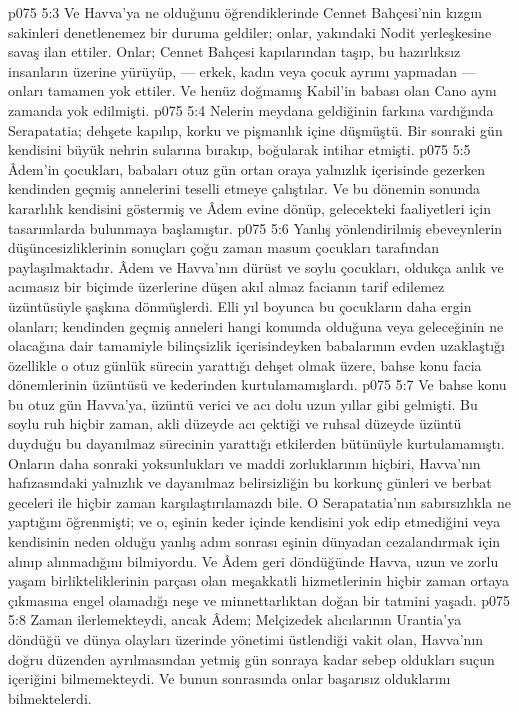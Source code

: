 \vs p075 5:3 Ve Havva’ya ne olduğunu öğrendiklerinde Cennet Bahçesi’nin kızgın sakinleri denetlenemez bir duruma geldiler; onlar, yakındaki Nodit yerleşkesine savaş ilan ettiler. Onlar; Cennet Bahçesi kapılarından taşıp, bu hazırlıksız insanların üzerine yürüyüp, --- erkek, kadın veya çocuk ayrımı yapmadan --- onları tamamen yok ettiler. Ve henüz doğmamış Kabil’in babası olan Cano aynı zamanda yok edilmişti.
\vs p075 5:4 Nelerin meydana geldiğinin farkına vardığında Serapatatia; dehşete kapılıp, korku ve pişmanlık içine düşmüştü. Bir sonraki gün kendisini büyük nehrin sularına bırakıp, boğularak intihar etmişti.
\vs p075 5:5 Âdem’in çocukları, babaları otuz gün ortan oraya yalnızlık içerisinde gezerken kendinden geçmiş annelerini teselli etmeye çalıştılar. Ve bu dönemin sonunda kararlılık kendisini göstermiş ve Âdem evine dönüp, gelecekteki faaliyetleri için tasarımlarda bulunmaya başlamıştır.
\vs p075 5:6 Yanlış yönlendirilmiş ebeveynlerin düşüncesizliklerinin sonuçları çoğu zaman masum çocukları tarafından paylaşılmaktadır. Âdem ve Havva’nın dürüst ve soylu çocukları, oldukça anlık ve acımasız bir biçimde üzerlerine düşen akıl almaz facianın tarif edilemez üzüntüsüyle şaşkına dönmüşlerdi. Elli yıl boyunca bu çocukların daha ergin olanları; kendinden geçmiş anneleri hangi konumda olduğuna veya geleceğinin ne olacağına dair tamamiyle bilinçsizlik içerisindeyken babalarının evden uzaklaştığı özellikle o otuz günlük sürecin yarattığı dehşet olmak üzere, bahse konu facia dönemlerinin üzüntüsü ve kederinden kurtulamamışlardı.
\vs p075 5:7 Ve bahse konu bu otuz gün Havva’ya, üzüntü verici ve acı dolu uzun yıllar gibi gelmişti. Bu soylu ruh hiçbir zaman, akli düzeyde acı çektiği ve ruhsal düzeyde üzüntü duyduğu bu dayanılmaz sürecinin yarattığı etkilerden bütünüyle kurtulamamıştı. Onların daha sonraki yoksunlukları ve maddi zorluklarının hiçbiri, Havva’nın hafızasındaki yalnızlık ve dayanılmaz belirsizliğin bu korkunç günleri ve berbat geceleri ile hiçbir zaman karşılaştırılamazdı bile. O Serapatatia’nın sabırsızlıkla ne yaptığını öğrenmişti; ve o, eşinin keder içinde kendisini yok edip etmediğini veya kendisinin neden olduğu yanlış adım sonrası eşinin dünyadan cezalandırmak için alınıp alınmadığını bilmiyordu. Ve Âdem geri döndüğünde Havva, uzun ve zorlu yaşam birlikteliklerinin parçası olan meşakkatli hizmetlerinin hiçbir zaman ortaya çıkmasına engel olamadığı neşe ve minnettarlıktan doğan bir tatmini yaşadı.
\vs p075 5:8 Zaman ilerlemekteydi, ancak Âdem; Melçizedek alıcılarının Urantia’ya döndüğü ve dünya olayları üzerinde yönetimi üstlendiği vakit olan, Havva’nın doğru düzenden ayrılmasından yetmiş gün sonraya kadar sebep oldukları suçun içeriğini bilmemekteydi. Ve bunun sonrasında onlar başarısız olduklarını bilmektelerdi.
